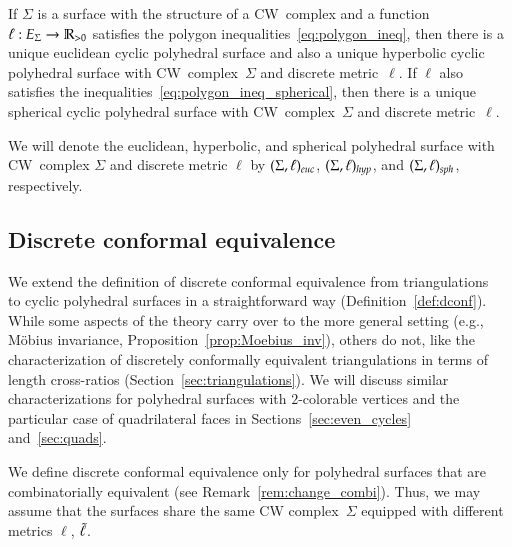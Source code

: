 \documentclass[Thesis]{subfiles}
\begin{document}
\begin{propdef}
  \label{def:sigma_ell_g}
  If $\Sigma$ is a surface with the structure of a CW~complex and a
  function $\ell:E_{\Sigma}\rightarrow\mathbb R_{>0}$ satisfies the polygon
  inequalities~\eqref{eq:polygon_ineq}, then there is a unique
  euclidean cyclic polyhedral surface and also a unique hyperbolic
  cyclic polyhedral surface with CW~complex~$\Sigma$ and discrete
  metric~$\ell$. If $\ell$ also satisfies the
  inequalities~\eqref{eq:polygon_ineq_spherical}, then there is a
  unique spherical cyclic polyhedral surface with CW~complex~$\Sigma$
  and discrete metric~$\ell$. 

  We will denote the euclidean, hyperbolic, and spherical polyhedral
  surface with CW~complex $\Sigma$ and discrete metric $\ell$ by\/
  $(\Sigma,\ell)_{\euc}$, $(\Sigma,\ell)_{\mathit{hyp}}$, and\/
  $(\Sigma,\ell)_{\mathit{sph}}$, respectively.
\end{propdef}

\subsection{Discrete conformal equivalence}
\label{sec:discr-conf-equiv}

We extend the definition of discrete conformal equivalence from
triangulations~\cite{Luo2004:Yamabe,BPS2015:dconf} to cyclic
polyhedral surfaces in a straightforward way
(Definition~\ref{def:dconf}). While some aspects of the theory carry
over to the more general setting (e.g., M{\"o}bius invariance,
Proposition~\ref{prop:Moebius_inv}), others do not, like the
characterization of discretely conformally equivalent triangulations
in terms of length cross-ratios (Section~\ref{sec:triangulations}). We
will discuss similar characterizations for polyhedral surfaces with
$2$-colorable vertices and the particular case of quadrilateral faces
in Sections~\ref{sec:even_cycles} and~\ref{sec:quads}.

We define discrete conformal equivalence only for polyhedral surfaces
that are combinatorially equivalent (see
Remark~\ref{rem:change_combi}). Thus, we may assume that the surfaces
share the same CW complex~$\Sigma$ equipped with different metrics
$\ell$, $\tilde{\ell}$.
\end{document}
